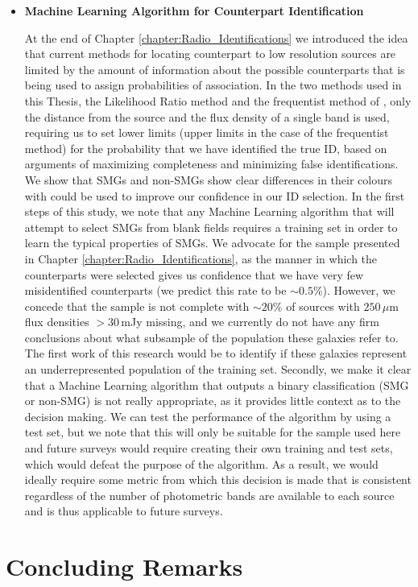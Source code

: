\begin{itemize}
\item \textbf{Machine Learning Algorithm for Counterpart Identification}

At the end of Chapter \ref{chapter:Radio_Identifications} we introduced the idea that current methods for locating counterpart to low resolution sources are limited by the amount of information about the possible counterparts that is being used to assign probabilities of association. In the two methods used in this Thesis, the Likelihood Ratio method and the frequentist method of \citealt{Lilly_1999}, only the distance from the source and the flux density of a single band is used, requiring us to set lower limits (upper limits in the case of the frequentist method) for the probability that we have identified the true ID, based on arguments of maximizing completeness and minimizing false identifications. We show that SMGs and non-SMGs show clear differences in their colours with could be used to improve our confidence in our ID selection. In the first steps of this study, we note that any Machine Learning algorithm that will attempt to select SMGs from blank fields requires a training set in order to learn the typical properties of SMGs. We advocate for the sample presented in Chapter \ref{chapter:Radio_Identifications}, as the manner in which the counterparts were selected gives us confidence that we have very few misidentified counterparts (we predict this rate to be $\sim0.5\%$). However, we concede that the sample is not complete with $\sim20\%$ of sources with $250\,\mu$m flux densities $>30\,$mJy missing, and we currently do not have any firm conclusions about what subsample of the population these galaxies refer to. The first work of this research would be to identify if these galaxies represent an underrepresented population of the training set. Secondly, we make it clear that a Machine Learning algorithm that outputs a binary classification (SMG or non-SMG) is not really appropriate, as it provides little context as to the decision making. We can test the performance of the algorithm by using a test set, but we note that this will only be suitable for the sample used here and future surveys would require creating their own training and test sets, which would defeat the purpose of the algorithm. As a result, we would ideally require some metric from which this decision is made that is consistent regardless of the number of photometric bands are available to each source and is thus applicable to future surveys.

\end{itemize}

\section{Concluding Remarks}


